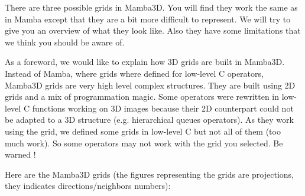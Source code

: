\documentclass[a4paper,10pt,oneside]{article}
\begin{document}
There are three possible grids in Mamba3D. You will
find they work the same as in Mamba except that they are a bit more
difficult to represent. We will try to give you an overview
of what they look like. Also they have some limitations that we think you
should be aware of.

As a foreword, we would like to explain how 3D grids are built in Mamba3D.
Instead of Mamba, where grids where defined for low-level C operators, Mamba3D
grids are very high level complex structures. They are built using 2D grids and
a mix of programmation magic. Some operators were rewritten in low-level C
functions working on 3D images because their 2D counterpart could not be adapted
to a 3D structure (e.g. hierarchical queues operators). As they work using the
grid, we defined some grids in low-level C but not all of them (too much work).
So some operators may not work with the grid you selected. Be warned !


Here are the Mamba3D grids (the figures representing the grids are projections,
they indicates directions/neighbors numbers):
\end{document}
